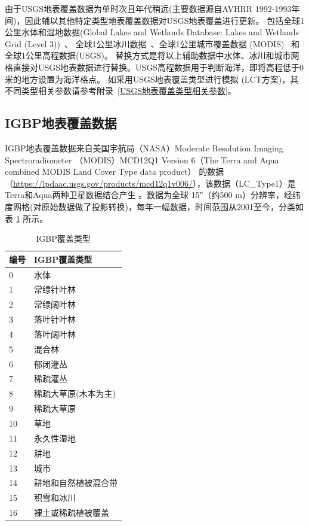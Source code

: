 由于USGS地表覆盖数据为单时次且年代稍远(主要数据源自AVHRR 1992-1993年间)，因此辅以其他特定类型地表覆盖数据对USGS地表覆盖进行更新。
包括全球1公里水体和湿地数据(Global Lakes and Wetlands Database: Lakes and Wetlands Grid (Level 3))~\citep{lehner2004development}、
全球1公里冰川数据~\citep{RGIConsortium2017}、全球1公里城市覆盖数据 (MODIS)~\citep{schneider2009new} 和全球1公里高程数据(USGS)。
替换方式是将以上辅助数据中水体、冰川和城市网格直接对USGS地表数据进行替换。USGS高程数据用于判断海洋，即将高程低于0米的地方设置为海洋格点。
如采用USGS地表覆盖类型进行模拟 (LCT方案)，其不同类型相关参数请参考附录~\ref{USGS地表覆盖类型相关参数}。

\subsection{IGBP地表覆盖数据}\label{IGBP地表覆盖数据}
IGBP地表覆盖数据来自美国宇航局（NASA）Moderate Resolution Imaging Spectroradiometer 
（MODIS）MCD12Q1 Version 6（The Terra and Aqua combined MODIS Land Cover Type data product）
的数据（\url{https://lpdaac.usgs.gov/products/mcd12q1v006/}），该数据（LC\_Type1）是Terra和Aqua两种卫星数据结合产生 
 \citep{Friedl2019}。数据为全球 \ang{;;15}（约500 m）分辨率，经纬度网格(对原始数据做了投影转换)，每年一幅数据，时间范围从2001至今，分类如表 \ref{tab:IGBP覆盖类型} 所示。

\begin{table}[]
\centering
\caption{IGBP覆盖类型}
\label{tab:IGBP覆盖类型}
\begin{tabular}{@{}ll@{}}
\toprule
编号 & IGBP覆盖类型     \\ \midrule
0  & 水体           \\
1  & 常绿针叶林           \\
2  & 常绿阔叶林      \\
3  & 落叶针叶林     \\
4  & 落叶阔叶林 \\
5  & 混合林     \\
6  & 郁闭灌丛      \\
7  & 稀疏灌丛           \\
8  & 稀疏大草原(木本为主)         \\
9  & 稀疏大草原     \\
10 & 草地         \\
11 & 永久性湿地        \\
12 & 耕地        \\
13 & 城市        \\
14 & 耕地和自然植被混合带        \\
15 & 积雪和冰川        \\
16 & 裸土或稀疏植被覆盖       \\ \bottomrule
\end{tabular}
\end{table}


